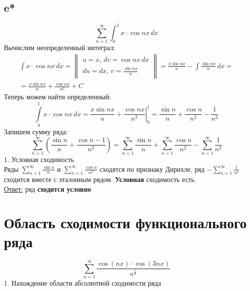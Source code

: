 \documentclass[a5paper, 10pt]{article}
\theoremstyle{definition}
\theoremstyle{plain}
\theoremstyle{remark}
\begin{document}
\subsection{e*}
\begin{equation}
\sum \limits_{n = 1}^{\infty}\int_0^1 x \cdot \cos nx \, dx
\end{equation}
Вычислим неопределенный интеграл:
\begin{multline*}
\int x \cdot \cos nx \, dx =
\begin{Vmatrix}
   u = x, \, dv =  \cos nx \, dx\\
   du = dx, \, v = \frac{\sin nx}{n}
 \end{Vmatrix}
= \frac{x\sin nx}{n} - \int \frac{\sin nx}{n} \, dx =\\ = \frac{x\sin nx}{n} + \frac{\cos nx}{n^2} + C
\end{multline*}
Теперь можем найти определенный:
\begin{equation*}
\int\limits_{0}^{1} x \cdot \cos nx \, dx = \left. \frac{x\sin nx}{n} + \frac{\cos nx}{n^2} \right|_{0}^{1} =
\frac{\sin n}{n} + \frac{\cos n}{n^2} - \frac{1}{n^2}
\end{equation*}
Запишем сумму ряда:
\begin{equation}
\sum \limits_{n = 1}^{\infty} \left(\frac{\sin n}{n} + \frac{\cos n - 1}{n^2} \right) = 
\sum \limits_{n = 1}^{\infty} \frac{\sin n}{n} +\sum \limits_{n = 1}^{\infty}  \frac{\cos n}{n^2} - \sum \limits_{n = 1}^{\infty}  \frac{1}{n^2}
\end{equation}
1. Условная сходимость\\
Ряды $\sum \limits_{n = 1}^{\infty} \frac{\sin n}{n}$ и $\sum \limits_{n = 1}^{\infty}  \frac{\cos n}{n^2}$ сходятся по признаку Дирихле, ряд $-\sum \limits_{n = 1}^{\infty}  \frac{1}{n^2}$ сходится вместе с эталонным рядом. \textbf{Условная} сходимость есть.\\

\underline{Ответ:} ряд  \textbf{сходится условно}


\newpage
\section{Область сходимости функционального ряда}

\begin{equation}
\sum \limits_{n = 1}^{\infty}\frac{\cos( nx) \cdot \cos (3nx) }{n^{\frac{x}{3}}}
\end{equation}
1. Нахождение области абсолютной сходимости ряда\\
\end{document}
